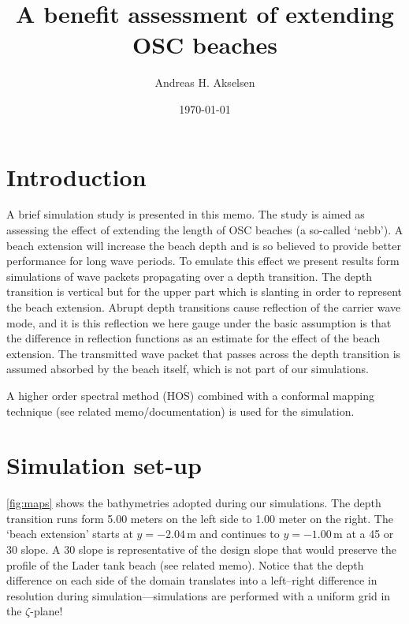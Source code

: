 \documentclass[internal]{sintefmemo}
\title{A benefit assessment of extending OSC beaches}
\author{Andreas H. Akselsen}
\date{\today}
\renewcommand{\_}[1]{_\mr{#1}}
\newcommand{\zz}{\zeta}
\begin{document}
\frontmatter


\section{Introduction}
A brief simulation study is presented in this memo. 
The study is aimed as assessing the effect of extending the length of OSC beaches (a so-called `nebb').
A beach extension will increase the beach depth and is so believed to provide better performance for long wave periods. 
To emulate this effect we present results form simulations of wave packets propagating over a depth transition.
The depth transition is vertical but for the upper part which is slanting in order to represent the beach extension. 
Abrupt depth transitions cause reflection of the carrier wave mode, and it is this reflection we here gauge
under the basic assumption is that the difference in reflection functions as an estimate for the effect of the beach extension.
The transmitted wave packet that passes across the depth transition is assumed absorbed by the beach itself, which is not part of our simulations.

A higher order spectral method (HOS) combined with a conformal mapping technique (see related memo/documentation) is used for the simulation.


\section{Simulation set-up}
\label{sec:setup}
\autoref{fig:maps} shows the bathymetries adopted during our simulations. 
The depth transition runs form 5.00 meters on the left side to 1.00 meter on the right.
The `beach extension' starts at $y=-2.04$\,m and continues to  $y=-1.00$\,m at a 45\textdegree{} or 30\textdegree{} slope.
A 30\textdegree{} slope is representative of the design slope that would preserve the profile of the Lader tank beach (see related memo).
Notice that the depth difference on each side of the domain translates into a left--right difference in resolution during simulation---simulations are performed with a uniform grid in the $\zz$-plane!
\end{document}
